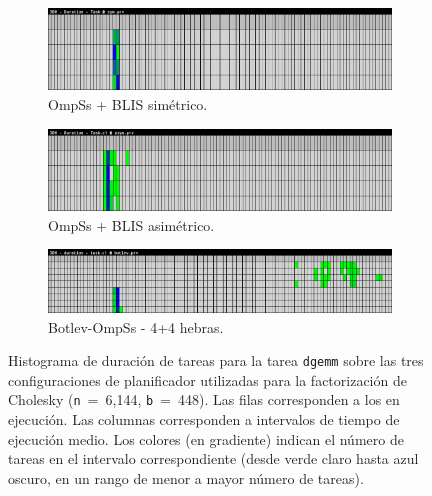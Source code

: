 \begin{figure}%
\centering
	\begin{subfigure}{\textwidth}
   \includegraphics[width=\textwidth]{Plots/Traces/sym_task_duration_histogram.png}
 \caption{OmpSs + BLIS simétrico.}
	\end{subfigure}
	\begin{subfigure}{\textwidth}
   \includegraphics[width=\textwidth]{Plots/Traces/asym_task_duration_histogram.png}
		\caption{OmpSs + BLIS asimétrico.}
	\end{subfigure}
	\begin{subfigure}{\textwidth}
   \includegraphics[width=\textwidth]{Plots/Traces/botlev_task_duration_histogram.png}
 \caption{Botlev-OmpSs - 4+4 hebras.}
	\end{subfigure}
	\caption[Histograma de duración de tareas para la tarea {\tt dgemm} sobre las tres configuraciones de planificador.]{Histograma de duración de tareas para la tarea {\tt dgemm} sobre las tres configuraciones de planificador utilizadas para la factorización de Cholesky ({\tt n}~=~6,144, {\tt b}~=~448).  
	Las filas corresponden a los \wts en ejecución. Las columnas corresponden a intervalos de tiempo de ejecución medio. Los colores (en gradiente) indican el número de tareas en el 
	intervalo correspondiente (desde verde claro hasta azul oscuro, en un rango de menor a mayor número de tareas).}
\label{fig:traces_task_duration}
\end{figure}


